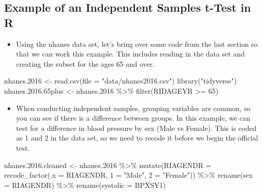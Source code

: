 \documentclass[
  letterpaper,
  DIV=11,
  numbers=noendperiod]{scrreprt}
\newenvironment{Shaded}{\begin{snugshade}}{\end{snugshade}}
\newcommand{\AttributeTok}[1]{\textcolor[rgb]{0.40,0.45,0.13}{#1}}
\newcommand{\DecValTok}[1]{\textcolor[rgb]{0.68,0.00,0.00}{#1}}
\newcommand{\FloatTok}[1]{\textcolor[rgb]{0.68,0.00,0.00}{#1}}
\newcommand{\FunctionTok}[1]{\textcolor[rgb]{0.28,0.35,0.67}{#1}}
\newcommand{\NormalTok}[1]{\textcolor[rgb]{0.00,0.23,0.31}{#1}}
\newcommand{\OtherTok}[1]{\textcolor[rgb]{0.00,0.23,0.31}{#1}}
\newcommand{\SpecialCharTok}[1]{\textcolor[rgb]{0.37,0.37,0.37}{#1}}
\newcommand{\StringTok}[1]{\textcolor[rgb]{0.13,0.47,0.30}{#1}}
\providecommand{\tightlist}{%
  \setlength{\itemsep}{0pt}\setlength{\parskip}{0pt}}\usepackage{longtable,booktabs,array}
\begin{document}
\subsection{Example of an Independent Samples t-Test in
R}\label{example-of-an-independent-samples-t-test-in-r}

\begin{itemize}
\tightlist
\item
  Using the nhanes data set, let's bring over some code from the last
  section so that we can work this example. This includes reading in the
  data set and creating the subset for the ages 65 and over.
\end{itemize}

\begin{Shaded}
\begin{Highlighting}[]
\NormalTok{nhanes}\FloatTok{.2016} \OtherTok{\textless{}{-}} \FunctionTok{read.csv}\NormalTok{(}\AttributeTok{file =} \StringTok{"data/nhanes2016.csv"}\NormalTok{)}
\FunctionTok{library}\NormalTok{(}\StringTok{"tidyverse"}\NormalTok{)}
\NormalTok{nhanes.}\FloatTok{2016.65}\NormalTok{plus }\OtherTok{\textless{}{-}}\NormalTok{ nhanes}\FloatTok{.2016} \SpecialCharTok{\%\textgreater{}\%}
    \FunctionTok{filter}\NormalTok{(RIDAGEYR }\SpecialCharTok{\textgreater{}=} \DecValTok{65}\NormalTok{)}
\end{Highlighting}
\end{Shaded}

\begin{itemize}
\tightlist
\item
  When conducting independent samples, grouping variables are common, so
  you can see if there is a difference between groups. In this example,
  we can test for a difference in blood pressure by sex (Male vs
  Female). This is coded as 1 and 2 in the data set, so we need to
  recode it before we begin the official test.
\end{itemize}

\begin{Shaded}
\begin{Highlighting}[]
\NormalTok{nhanes.}\FloatTok{2016.}\NormalTok{cleaned }\OtherTok{\textless{}{-}}\NormalTok{ nhanes}\FloatTok{.2016} \SpecialCharTok{\%\textgreater{}\%}
    \FunctionTok{mutate}\NormalTok{(}\AttributeTok{RIAGENDR =} \FunctionTok{recode\_factor}\NormalTok{(}\AttributeTok{.x =}\NormalTok{ RIAGENDR, }\StringTok{\textasciigrave{}}\AttributeTok{1}\StringTok{\textasciigrave{}} \OtherTok{=} \StringTok{"Male"}\NormalTok{, }\StringTok{\textasciigrave{}}\AttributeTok{2}\StringTok{\textasciigrave{}} \OtherTok{=} \StringTok{"Female"}\NormalTok{)) }\SpecialCharTok{\%\textgreater{}\%}
    \FunctionTok{rename}\NormalTok{(}\AttributeTok{sex =}\NormalTok{ RIAGENDR) }\SpecialCharTok{\%\textgreater{}\%}
    \FunctionTok{rename}\NormalTok{(}\AttributeTok{systolic =}\NormalTok{ BPXSY1)}
\end{Highlighting}
\end{Shaded}
\end{document}
